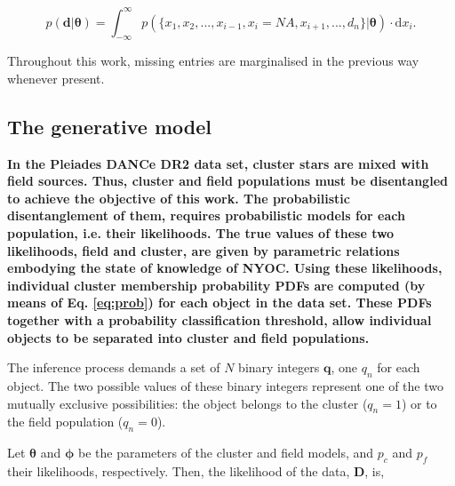 \begin{equation}
\label{eq:marginalmiss}
p(\mathbf{d}|\boldsymbol{\theta})= \int_{-\infty}^{\infty} p(\{x_1,x_2,...,x_{i-1},x_{i}= NA,x_{i+1},...,d_n\}|\boldsymbol{\theta})\cdot \mathrm{d}x_{i}.
\end{equation}

Throughout this work, missing entries are marginalised in the previous way whenever present.


\subsection{The generative model}
\label{sect:generative-model}
\textbf{In the Pleiades DANCe DR2 data set, cluster stars are mixed with field sources. Thus, cluster and field populations must be disentangled to achieve the objective of this work. The probabilistic disentanglement of them, requires probabilistic models for each population, i.e. their likelihoods. The true values of these two likelihoods, field and cluster, are given by parametric relations embodying the state of knowledge of NYOC.  Using these likelihoods, individual cluster membership probability PDFs are computed (by means of Eq. \ref{eq:prob}) for each object in the data set. These PDFs together with a probability classification threshold,  allow individual objects to be separated into cluster and field populations.}

The inference process demands a set of $N$ binary integers $\mathbf{q}$, one $q_n$ for each object. The two possible values of these binary integers represent one of the two mutually exclusive possibilities: the object belongs to the cluster ($q_n=1$) or to the field population ($q_n=0$). 

Let $\boldsymbol{\theta}$ and $\boldsymbol{\phi}$ be the parameters of the cluster and field models, and $p_c$ and $p_f$ their likelihoods, respectively. Then, the likelihood of the data, $\mathbf{D}$, is,

